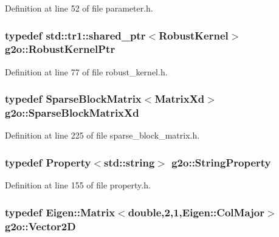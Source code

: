 Definition at line 52 of file parameter.\+h.

\subsubsection[{\texorpdfstring{Robust\+Kernel\+Ptr}{RobustKernelPtr}}]{\setlength{\rightskip}{0pt plus 5cm}typedef std\+::tr1\+::shared\+\_\+ptr$<${\bf Robust\+Kernel}$>$ {\bf g2o\+::\+Robust\+Kernel\+Ptr}}\hypertarget{namespaceg2o_a0802a5e01a6b1861ae01013220dec6ac}{}\label{namespaceg2o_a0802a5e01a6b1861ae01013220dec6ac}


Definition at line 77 of file robust\+\_\+kernel.\+h.

\subsubsection[{\texorpdfstring{Sparse\+Block\+Matrix\+Xd}{SparseBlockMatrixXd}}]{\setlength{\rightskip}{0pt plus 5cm}typedef {\bf Sparse\+Block\+Matrix}$<$Matrix\+Xd$>$ {\bf g2o\+::\+Sparse\+Block\+Matrix\+Xd}}\hypertarget{namespaceg2o_a268218b758e93d6d13f8d35a327a650a}{}\label{namespaceg2o_a268218b758e93d6d13f8d35a327a650a}


Definition at line 225 of file sparse\+\_\+block\+\_\+matrix.\+h.

\subsubsection[{\texorpdfstring{String\+Property}{StringProperty}}]{\setlength{\rightskip}{0pt plus 5cm}typedef {\bf Property}$<$std\+::string$>$ {\bf g2o\+::\+String\+Property}}\hypertarget{namespaceg2o_a40c5b0f5bf1dd1e5b9c25c20fcf43920}{}\label{namespaceg2o_a40c5b0f5bf1dd1e5b9c25c20fcf43920}


Definition at line 155 of file property.\+h.

\subsubsection[{\texorpdfstring{Vector2D}{Vector2D}}]{\setlength{\rightskip}{0pt plus 5cm}typedef Eigen\+::\+Matrix$<$double,2,1,Eigen\+::\+Col\+Major$>$ {\bf g2o\+::\+Vector2D}}\hypertarget{namespaceg2o_a98731c1a538fbbbb105bc81434ebdecb}{}\label{namespaceg2o_a98731c1a538fbbbb105bc81434ebdecb}


